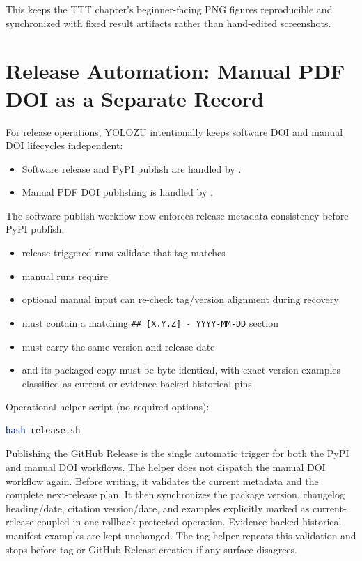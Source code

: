 This keeps the TTT chapter's beginner-facing PNG figures reproducible and synchronized with fixed result artifacts rather than hand-edited screenshots.

\section{Release Automation: Manual PDF DOI as a Separate Record}
For release operations, YOLOZU intentionally keeps software DOI and manual DOI lifecycles independent:
\begin{itemize}
  \item Software release and PyPI publish are handled by .
  \item Manual PDF DOI publishing is handled by .
\end{itemize}

The software publish workflow now enforces release metadata consistency before PyPI publish:
\begin{itemize}
  \item release-triggered runs validate that tag  matches 
  \item manual  runs require 
  \item optional manual input  can re-check tag/version alignment during recovery
  \item {} must contain a matching \texttt{\#\# [X.Y.Z] - YYYY-MM-DD} section
  \item {} must carry the same version and release date
  \item {} and its packaged copy must be byte-identical, with exact-version examples classified as current or evidence-backed historical pins
\end{itemize}

Operational helper script (no required options):
\begin{lstlisting}[language=bash]
bash release.sh
\end{lstlisting}
Publishing the GitHub Release is the single automatic trigger for both the PyPI and
manual DOI workflows. The helper does not dispatch the manual DOI workflow again.
Before writing, it validates the current metadata and the complete next-release
plan. It then synchronizes the package version, changelog heading/date, citation
version/date, and examples explicitly marked as current-release-coupled in one
rollback-protected operation. Evidence-backed historical manifest examples are
kept unchanged. The tag helper repeats this validation and stops before tag or
GitHub Release creation if any surface disagrees.

